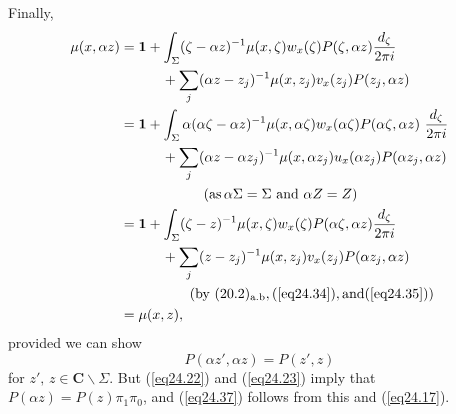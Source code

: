 \documentclass{surv-l}
\theoremstyle{plain}
\theoremstyle{definition}
\numberwithin{equation}{chapter}
\begin{document}
Finally,
\begin{align*}
\mu(x, \alpha z)& =\mathbf{1}+\int_{\Sigma}(\zeta-\alpha z)^{-1}\mu(x, \zeta)w_{x}(\zeta)P(\zeta, \alpha z)\frac{d_{\zeta}}{2\pi i}\\
&\qquad\quad +\sum_{j}(\alpha z-z_{j})^{-1}\mu(x, z_{j})v_{x}(z_{j})P(z_{j}, \alpha z)\\
& =\mathbf{1}+\int_{\Sigma}\alpha(\alpha\zeta-\alpha z)^{-1}\mu(x, \alpha\zeta)w_{x}(\alpha\zeta)P(\alpha\zeta,\alpha z)\ \frac{d_{\zeta}}{2\pi i}\\
&\qquad\quad +\sum_{j}(\alpha z -\alpha z_{j})^{-1}\mu(x, \alpha z_{j})u_{x}(\alpha z_{j})P(\alpha z_{j},\alpha z)\\
& \qquad \qquad\qquad  (\mathrm{as} \, \alpha\Sigma=\Sigma\ \mathrm{and}\ \alpha Z=Z)\\
& =\mathbf{1}+\int_{\Sigma}(\zeta-z)^{-1}\mu(x, \zeta)w_{x}(\zeta)P(\alpha\zeta, \alpha z)\frac{d_{\zeta}}{2\pi i}\\
&\quad\quad\quad +\sum_{j}(z-z_{j})^{-1}\mu(x, z_{j})v_{x}(z_{j})P(\alpha z_{j}, \alpha z)\\
& \qquad \qquad\quad(\text{by }(20.2)_{\text{a.b}}, (\ref{eq24.34}), \mathrm{and} (\ref{eq24.35}))\\
& =\mu(x, z),
\end{align*}
provided we can show
\setcounter{equation}{36}
\begin{equation}\label{eq24.37}
P(\alpha z', \alpha z)=P(z', z)
\end{equation}
for $z',\,z\in \mathbf{C}\backslash \Sigma$. But (\ref{eq24.22}) and (\ref{eq24.23}) imply that $P(\alpha z)=P(z)\pi_{1}\pi_{0}$, and (\ref{eq24.37}) follows from this and (\ref{eq24.17}).
\end{document}
